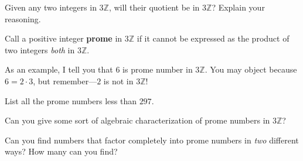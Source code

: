 \documentclass[nooutcomes]{ximera}
\begin{document}
\begin{question}
Given any two integers in $3\mathbb{Z}$, will their quotient be in $3\mathbb{Z}$?
Explain your reasoning.
\end{question}

\begin{definition}
Call a positive integer \textbf{prome} in $3\mathbb{Z}$ if it cannot be
expressed as the product of two integers \textit{both} in $3\mathbb{Z}$.
\end{definition}

As an example, I tell you that $6$ is prome number in $3\mathbb{Z}$. You may
object because $6 = 2\cdot 3$, but remember---$2$ is not in $3\mathbb{Z}$!


\begin{question}
List all the prome numbers less than $297$.
\end{question}

\begin{question}
Can you give some sort of algebraic characterization of prome numbers
in $3\mathbb{Z}$? 
\end{question}

\begin{question}
Can you find numbers that factor completely into prome numbers in
\textit{two} different ways? How many can you find?
\end{question}
\end{document}
